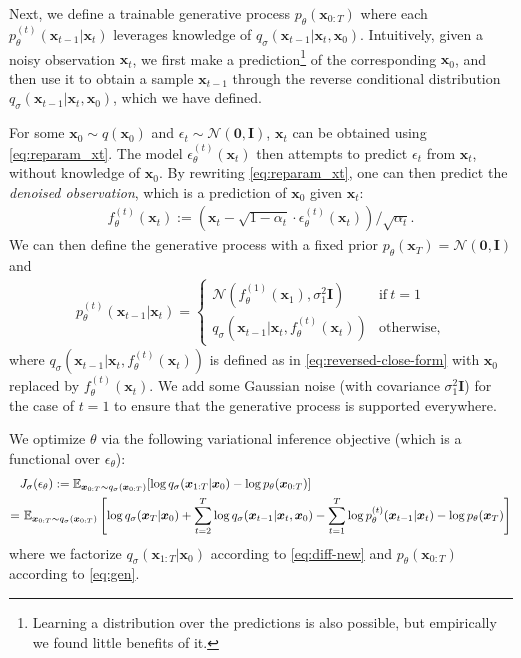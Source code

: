 Next, we define a trainable generative process $p_\theta(\bm{x}_{0:T})$ where each $p_{\theta}^{(t)}(\bm{x}_{t-1} | \bm{x}_t)$ %
 leverages knowledge of $q_\sigma(\bm{x}_{t-1} | \bm{x}_{t}, \bm{x}_0)$. %
Intuitively, given a noisy observation $\bm{x}_t$, we first make a prediction\footnote{Learning a distribution over the predictions is also possible, but empirically we found little benefits of it.} of the corresponding $\bm{x}_0$, 
and then use it to obtain a sample $\bm{x}_{t-1}$ through the reverse conditional distribution $q_\sigma(\bm{x}_{t-1} | \bm{x}_{t}, \bm{x}_0)$, which we have defined. %

For some $\bm{x}_0 \sim q(\bm{x}_0)$ and $\epsilon_t \sim \mathcal{N}(\bm{0}, \bm{I})$, 
$\bm{x}_t$ can be obtained using \eqref{eq:reparam_xt}. The model $\epsilon_\theta^{(t)}(\bm{x}_t)$ then attempts to predict $\epsilon_t$ from $\bm{x}_t$, without knowledge of $\bm{x}_0$.
By rewriting \eqref{eq:reparam_xt}, one can then predict the \textit{denoised observation}, which is a prediction of $\bm{x}_0$ given $\bm{x}_t$:
\begin{align}
    f_\theta^{(t)}(\bm{x}_t) := (\bm{x}_t - \sqrt{1 - \alpha_t} \cdot \epsilon_{\theta}^{(t)}(\bm{x}_t)) / \sqrt{\alpha_t}. \label{eq:x0-pred-def}
\end{align}
We can then define the generative process with a fixed prior $p_\theta(\bm{x}_T) = \mathcal{N}(\bm{0}, \bm{I})$ and
\begin{align}
    p_\theta^{(t)}(\bm{x}_{t-1} | \bm{x}_t) = \begin{cases}
    \mathcal{N}(f_\theta^{(1)}(\bm{x}_1), \sigma_1^2 \bm{I})  & \text{if} \ t = 1 \\
    q_\sigma(\bm{x}_{t-1} | \bm{x}_t, f_{\theta}^{(t)}(\bm{x}_t)) & \text{otherwise,}
    \end{cases} \label{eq:new-reverse}
\end{align}
where $q_\sigma(\bm{x}_{t-1} | \bm{x}_t, f_{\theta}^{(t)}(\bm{x}_t))$ is defined as in \eqref{eq:reversed-close-form} with $\bm{x}_0$ replaced by $f_{\theta}^{(t)}(\bm{x}_t)$. %
We add some Gaussian noise (with covariance $\sigma_1^2 \bm{I}$) for the case of $t = 1$ to ensure that the generative process is supported everywhere. 

We optimize $\theta$ via the following variational inference objective (which is a functional over $\epsilon_\theta$):
\begin{align}
   & J_\sigma(\epsilon_\theta) :=
   \bb{E}_{\bm{x}_{0:T} \sim q_\sigma(\bm{x}_{0:T})}[\log q_\sigma(\bm{x}_{1:T} | \bm{x}_0) - \log p_\theta(\bm{x}_{0:T})] \\
   = & \ \bb{E}_{\bm{x}_{0:T} \sim q_\sigma(\bm{x}_{0:T})} \left[\log q_\sigma(\bm{x}_T | \bm{x}_0) + \sum_{t=2}^{T} \log q_\sigma(\bm{x}_{t-1} | \bm{x}_t, \bm{x}_0) - \sum_{t=1}^{T} \log p_\theta^{(t)}(\bm{x}_{t-1} | \bm{x}_t) - \log p_\theta(\bm{x}_T) \right] \nonumber%
\end{align}
where we factorize $q_\sigma(\bm{x}_{1:T} | \bm{x}_0)$ according to \eqref{eq:diff-new} and $p_\theta(\bm{x}_{0:T})$ according to \eqref{eq:gen}.


